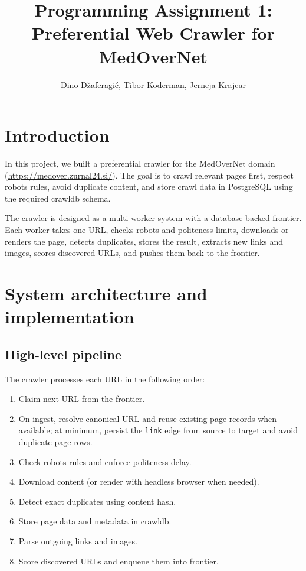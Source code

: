\documentclass[9pt]{IEEEtran}
\title{\vspace{0ex}
Programming Assignment 1: Preferential Web Crawler for MedOverNet}
\author{ Dino Džaferagić, Tibor Koderman, Jerneja Krajcar}\vspace{-4.0ex}
\begin{document}
\maketitle

\section{Introduction}
In this project, we built a preferential crawler for the MedOverNet domain (\url{https://medover.zurnal24.si/}). The goal is to crawl relevant pages first, respect robots rules, avoid duplicate content, and store crawl data in PostgreSQL using the required crawldb schema.

The crawler is designed as a multi-worker system with a database-backed frontier. Each worker takes one URL, checks robots and politeness limits, downloads or renders the page, detects duplicates, stores the result, extracts new links and images, scores discovered URLs, and pushes them back to the frontier.

\section{System architecture and implementation}
\subsection{High-level pipeline}
The crawler processes each URL in the following order:
\begin{enumerate}
    \item Claim next URL from the frontier.
    \item On ingest, resolve canonical URL and reuse existing page records when available; at minimum, persist the \texttt{link} edge from source to target and avoid duplicate page rows.
    \item Check robots rules and enforce politeness delay.
    \item Download content (or render with headless browser when needed).
    \item Detect exact duplicates using content hash.
    \item Store page data and metadata in crawldb.
    \item Parse outgoing links and images.
    \item Score discovered URLs and enqueue them into frontier.
\end{enumerate}
\end{document}

